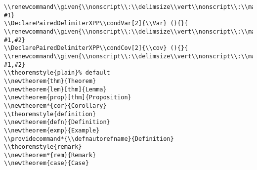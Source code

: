 \documentclass[c]{article}
\DeclareMathOperator{\Var}{Var}
\DeclareMathOperator{\cov}{Cov}
\providecommand\given{}
\renewcommand\given{\nonscript\:\delimsize\vert\nonscript\:\mathopen{}}
\renewcommand\given{\nonscript\:\delimsize\vert\nonscript\:\mathopen{}}
\renewcommand\given{\nonscript\:\delimsize\vert\nonscript\:\mathopen{}}
\renewcommand\given{\nonscript\:\delimsize\vert\nonscript\:\mathopen{}}
\theoremstyle{plain}%
\theoremstyle{definition}
\providecommand*{\defnautorefname}{Definition}
\theoremstyle{remark}
\begin{document}
\begin{verbatim}
\\renewcommand\\given{\\nonscript\\:\\delimsize\\vert\\nonscript\\:\\mathopen{}}
#1}
\\DeclarePairedDelimiterXPP\\condVar[2]{\\Var} (){}{
\\renewcommand\\given{\\nonscript\\:\\delimsize\\vert\\nonscript\\:\\mathopen{}}
#1,#2}
\\DeclarePairedDelimiterXPP\\condCov[2]{\\cov} (){}{
\\renewcommand\\given{\\nonscript\\:\\delimsize\\vert\\nonscript\\:\\mathopen{}}
#1,#2}
\\theoremstyle{plain}% default
\\newtheorem{thm}{Theorem}
\\newtheorem{lem}[thm]{Lemma}
\\newtheorem{prop}[thm]{Proposition}
\\newtheorem*{cor}{Corollary}
\\theoremstyle{definition}
\\newtheorem{defn}{Definition}
\\newtheorem{exmp}{Example}
\\providecommand*{\\defnautorefname}{Definition}
\\theoremstyle{remark}
\\newtheorem*{rem}{Remark}
\\newtheorem{case}{Case}



\end{verbatim}
\end{document}
